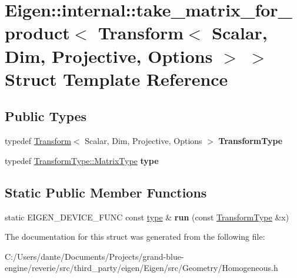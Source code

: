 \hypertarget{struct_eigen_1_1internal_1_1take__matrix__for__product_3_01_transform_3_01_scalar_00_01_dim_00_0edf36e01556babc5f053852863696371}{}\section{Eigen\+::internal\+::take\+\_\+matrix\+\_\+for\+\_\+product$<$ Transform$<$ Scalar, Dim, Projective, Options $>$ $>$ Struct Template Reference}
\label{struct_eigen_1_1internal_1_1take__matrix__for__product_3_01_transform_3_01_scalar_00_01_dim_00_0edf36e01556babc5f053852863696371}
\subsection*{Public Types}
\begin{DoxyCompactItemize}
\item 
\mbox{\label{struct_eigen_1_1internal_1_1take__matrix__for__product_3_01_transform_3_01_scalar_00_01_dim_00_0edf36e01556babc5f053852863696371_a371d187a7293e8b31ec9d83599a1dfb1}} 
typedef \mbox{\hyperlink{class_eigen_1_1_transform}{Transform}}$<$ Scalar, Dim, Projective, Options $>$ {\bfseries Transform\+Type}
\item 
\mbox{\label{struct_eigen_1_1internal_1_1take__matrix__for__product_3_01_transform_3_01_scalar_00_01_dim_00_0edf36e01556babc5f053852863696371_afcc69bab7b56e46df8a3b16c33e35d6f}} 
typedef \mbox{\hyperlink{class_eigen_1_1_transform_a30f72ba46abc2bb3c7fa919c1078fc9c}{Transform\+Type\+::\+Matrix\+Type}} {\bfseries type}
\end{DoxyCompactItemize}
\subsection*{Static Public Member Functions}
\begin{DoxyCompactItemize}
\item 
\mbox{\label{struct_eigen_1_1internal_1_1take__matrix__for__product_3_01_transform_3_01_scalar_00_01_dim_00_0edf36e01556babc5f053852863696371_a5765f43d28e405572a1658470f8fee86}} 
static E\+I\+G\+E\+N\+\_\+\+D\+E\+V\+I\+C\+E\+\_\+\+F\+U\+NC const \mbox{\hyperlink{class_eigen_1_1_matrix}{type}} \& {\bfseries run} (const \mbox{\hyperlink{class_eigen_1_1_transform}{Transform\+Type}} \&x)
\end{DoxyCompactItemize}


The documentation for this struct was generated from the following file\+:\begin{DoxyCompactItemize}
\item 
C\+:/\+Users/dante/\+Documents/\+Projects/grand-\/blue-\/engine/reverie/src/third\+\_\+party/eigen/\+Eigen/src/\+Geometry/Homogeneous.\+h\end{DoxyCompactItemize}
